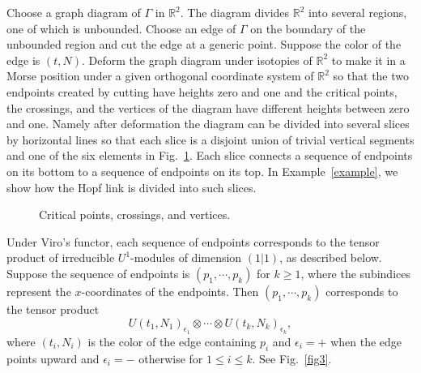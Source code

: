 \documentclass[12pt]{amsart}
\begin{document}
Choose a graph diagram of $\Gamma$ in $\mathbb{R}^2$. The diagram divides $\mathbb{R}^2$ into several regions, one of which is unbounded. Choose an edge of $\Gamma$ on the boundary of the unbounded region and cut the edge at a generic point. Suppose the color of the edge is $(t, N)$. Deform the graph diagram under isotopies of $\mathbb{R}^2$ to make it in a Morse position under a given orthogonal coordinate system of $\mathbb{R}^{2}$ so that the two endpoints created by cutting have heights zero and one and the critical points, the crossings, and the vertices of the diagram have different heights between zero and one. Namely after deformation the diagram can be divided into several slices by horizontal lines so that each slice is a disjoint union of trivial vertical segments and one of the six elements in Fig.~\ref{fig2}. Each slice connects a sequence of endpoints on its bottom to a sequence of endpoints on its top. In Example~\ref{example}, we show how the Hopf link is divided into such slices.

\begin{figure}
\hspace{6mm}
\hspace{6mm}
\caption{Critical points, crossings, and vertices. }
\label{fig2}
\end{figure}

Under Viro's functor, each sequence of endpoints corresponds to the tensor product of irreducible $U^1$-modules of dimension $(1 \vert 1)$, as described below. Suppose the sequence of endpoints is $(p_1, \cdots, p_k)$ for $k\geq 1$, where the subindices represent the $x$-coordinates of the endpoints. Then $(p_1, \cdots, p_k)$ corresponds to the tensor product $$U(t_1, N_1)_{\epsilon_1}\otimes \cdots \otimes U(t_k, N_k)_{\epsilon_k},$$ where $(t_i, N_i)$ is the color of the edge containing $p_i$ and $\epsilon_i=+$ when the edge points upward and $\epsilon_i=-$ otherwise for $1\leq i\leq k$. See Fig.~\ref{fig3}.
\end{document}
